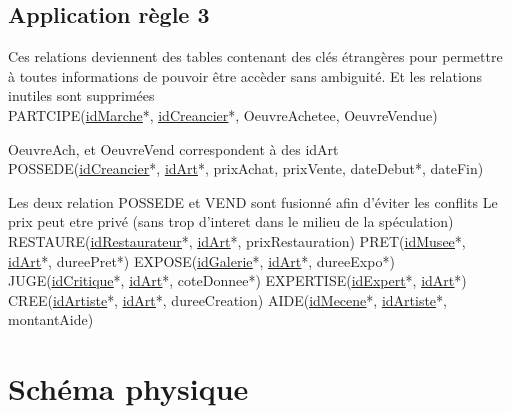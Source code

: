 \documentclass{article}
\begin{document}
\subsection{Application règle 3}

Ces relations deviennent des tables contenant des clés étrangères pour permettre à toutes informations de pouvoir être accèder sans ambiguité.
Et les relations inutiles sont supprimées 
\\
PARTCIPE(\underline{\underline{idMarche}}*, \underline{\underline{idCreancier}}*, OeuvreAchetee, OeuvreVendue) \newline

OeuvreAch, et OeuvreVend correspondent à des idArt \newline
\\
POSSEDE(\underline{\underline{idCreancier}}*, \underline{\underline{idArt}}*, prixAchat, prixVente, dateDebut*, dateFin) \newline

Les deux relation POSSEDE et VEND sont fusionné afin d'éviter les conflits \newline
Le prix peut etre privé (sans trop d'interet dans le milieu de la spéculation) \newline
\\
RESTAURE(\underline{\underline{idRestaurateur}}*, \underline{\underline{idArt}}*, prixRestauration) \newline
PRET(\underline{\underline{idMusee}}*, \underline{\underline{idArt}}*, dureePret*) \newline
EXPOSE(\underline{\underline{idGalerie}}*, \underline{\underline{idArt}}*, dureeExpo*) \newline
JUGE(\underline{\underline{idCritique}}*, \underline{\underline{idArt}}*, coteDonnee*) \newline
EXPERTISE(\underline{\underline{idExpert}}*, \underline{\underline{idArt}}*) \newline
CREE(\underline{\underline{idArtiste}}*, \underline{\underline{idArt}}*, dureeCreation) \newline
AIDE(\underline{\underline{idMecene}}*, \underline{\underline{idArtiste}}*, montantAide) \newline


\clearpage

\section{Schéma physique}
\end{document}
